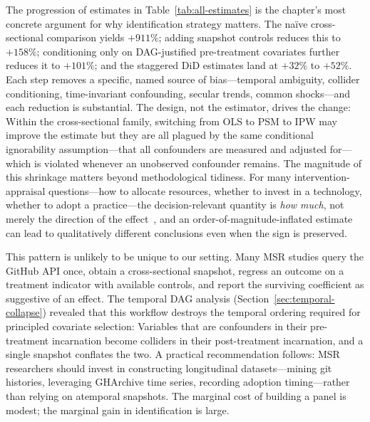 The progression of estimates in Table~\ref{tab:all-estimates} is the chapter's most concrete argument for why identification strategy matters.
The na\"ive cross-sectional comparison yields $+911\%$; adding snapshot controls reduces this to $+158\%$; conditioning only on DAG-justified pre-treatment covariates further reduces it to $+101\%$; and the staggered DiD estimates land at $+32\%$ to $+52\%$.
Each step removes a specific, named source of bias---temporal ambiguity, collider conditioning, time-invariant confounding, secular trends, common shocks---and each reduction is substantial.
The design, not the estimator, drives the change: Within the cross-sectional family, switching from OLS to PSM to IPW may improve the estimate but they are all plagued by the same conditional ignorability assumption---that all confounders are measured and adjusted for---which is violated whenever an unobserved confounder remains.
The magnitude of this shrinkage matters beyond methodological tidiness.
For many intervention-appraisal questions---how to allocate resources, whether to invest in a technology, whether to adopt a practice---the decision-relevant quantity is \emph{how much}, not merely the direction of the effect~\cite{lundberg2021estimand}, and an order-of-magnitude-inflated estimate can lead to qualitatively different conclusions even when the sign is preserved.

This pattern is unlikely to be unique to our setting.
Many MSR studies query the GitHub API once, obtain a cross-sectional snapshot, regress an outcome on a treatment indicator with available controls, and report the surviving coefficient as suggestive of an effect.
The temporal DAG analysis (Section~\ref{sec:temporal-collapse}) revealed that this workflow destroys the temporal ordering required for principled covariate selection: Variables that are confounders in their pre-treatment incarnation become colliders in their post-treatment incarnation, and a single snapshot conflates the two.
A practical recommendation follows: MSR researchers should invest in constructing longitudinal datasets---mining git histories, leveraging GHArchive time series, recording adoption timing---rather than relying on atemporal snapshots.
The marginal cost of building a panel is modest; the marginal gain in identification is large.


